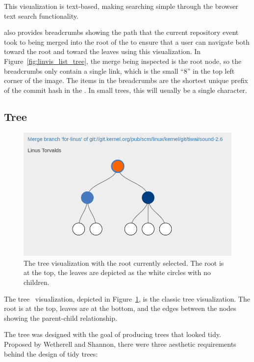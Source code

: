 This visualization is text-based, making
searching simple through the browser text search functionality.

\tool{} also provides breadcrumbs showing the path that the current
repository event took to being merged into the root of the \mt{} to
ensure that a user can navigate both toward the root and toward the
leaves using this visualization.
In Figure~\ref{fig:linvis_list_tree}, the merge being inspected is the
root node, so the breadcrumbs only contain a single link, which is the
small ``8'' in the top left corner of the image.
The items in the breadcrumbs are the shortest unique prefix of the
commit hash in the \mt{}.
In small trees, this will usually be a single character.

\subsection{\rt{} Tree}
\label{sub:rt_tree}

\begin{figure}[htpb]
  \centering
  \includegraphics[width=0.9\linewidth]{Figures/Linvis/linvis_reingold_tree.png}
  \caption{The \rt{} tree visualization with the root currently
    selected. The root is at the top, the leaves are depicted as the
    white circles with no children.}
  \label{fig:linvis_reingold_tree}
\end{figure}

The \rt{} tree~\cite{Reingold1981} visualization, depicted in
Figure~\ref{fig:linvis_reingold_tree}, is the classic tree
visualization. The root is at the top, leaves are at the bottom, and the
edges between the nodes showing the parent-child relationship.

The \rt{} tree was designed with the goal of producing trees that looked
tidy. Proposed by Wetherell and Shannon\cite{Wetherell1979}, there were
three aesthetic requirements behind the design of tidy trees:

